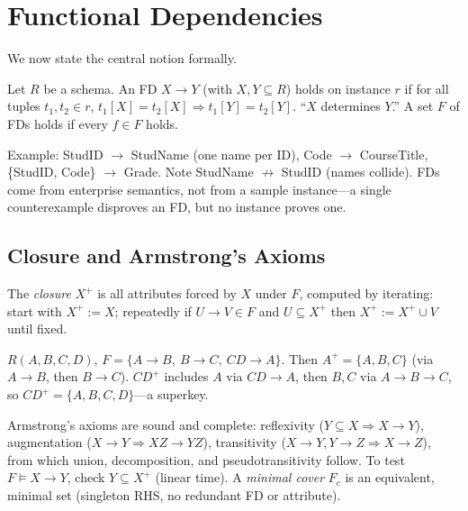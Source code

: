 \section{Functional Dependencies}
\label{sec:fds}

We now state the central notion formally.

\begin{definition}
Let $R$ be a schema. An FD $X\to Y$ (with $X,Y\subseteq R$) holds on instance $r$ if for all tuples $t_1,t_2\in r$, $t_1[X]=t_2[X]\Rightarrow t_1[Y]=t_2[Y]$. ``$X$ determines $Y$.'' A set $F$ of FDs holds if every $f\in F$ holds.
\end{definition}

Example: StudID $\to$ StudName (one name per ID), Code $\to$ CourseTitle, \{StudID, Code\} $\to$ Grade. Note StudName $\not\to$ StudID (names collide). FDs come from enterprise semantics, not from a sample instance---a single counterexample disproves an FD, but no instance proves one.

\subsection{Closure and Armstrong's Axioms}

The \emph{closure} $X^+$ is all attributes forced by $X$ under $F$, computed by iterating: start with $X^+:=X$; repeatedly if $U\to V\in F$ and $U\subseteq X^+$ then $X^+:=X^+\cup V$ until fixed.

\begin{example}[Closure]
$R(A,B,C,D)$, $F=\{A\to B,\ B\to C,\ CD\to A\}$. Then $A^+=\{A,B,C\}$ (via $A\to B$, then $B\to C$). $CD^+$ includes $A$ via $CD\to A$, then $B,C$ via $A\to B\to C$, so $CD^+= \{A,B,C,D\}$---a superkey.
\end{example}

Armstrong's axioms are sound and complete: reflexivity ($Y\subseteq X\Rightarrow X\to Y$), augmentation ($X\to Y\Rightarrow XZ\to YZ$), transitivity ($X\to Y, Y\to Z\Rightarrow X\to Z$), from which union, decomposition, and pseudotransitivity follow. To test $F\models X\to Y$, check $Y\subseteq X^+$ (linear time). A \emph{minimal cover} $F_c$ is an equivalent, minimal set (singleton RHS, no redundant FD or attribute).

